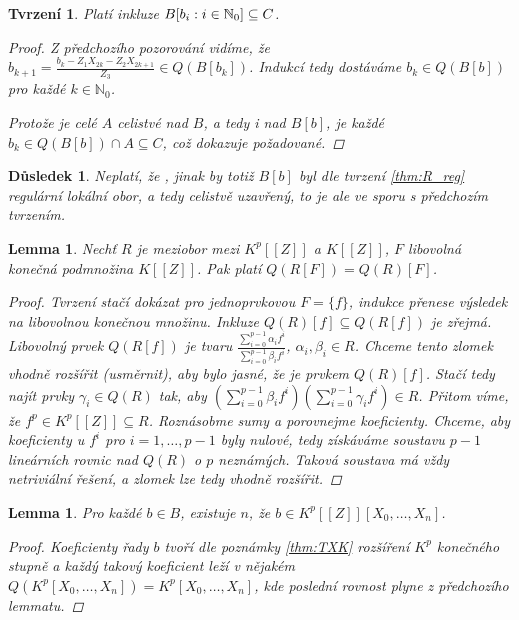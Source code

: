 \documentclass[11pt,a4paper]{article}
\newcommand\m[1]{\mathbb { #1 }} %
\newcommand\N{\m N}
\newcounter{numb}
\theoremstyle{definition}
\theoremstyle{plain}
\newtheorem{lemma}[numb]{Lemma}
\newtheorem{tvrzeni}[numb]{Tvrzení}
\newtheorem{dusledek}[numb]{Důsledek}
\begin{document}
\begin{tvrzeni}
	Platí inkluze $\Ball \subseteq C$.

	\begin{proof}
		Z předchozího pozorování vidíme, že $b_{k + 1} = \frac{b_k - Z_1 X_{2k} - Z_2 X_{2k + 1}}{Z_3} \in Q(B[b_k])$. Indukcí tedy dostáváme $b_k \in Q(B[b])$ pro každé $k \in \N_0$.

		Protože je celé $A$ celistvé nad $B$, a tedy i nad $B[b]$, je každé $b_k \in Q(B[b]) \cap A \subseteq C$, což dokazuje požadované.
	\end{proof}
\end{tvrzeni}

\begin{dusledek}
	Neplatí, že , jinak by totiž $B[b]$ byl dle tvrzení \ref{thm:R_reg} regulární lokální obor, a tedy celistvě uzavřený, to je ale ve sporu s předchozím tvrzením.
\end{dusledek}

\begin{lemma} \label{thm:QRf}
	Nechť $R$ je meziobor mezi $K^p[[Z]]$ a $K[[Z]]$, $F$ libovolná konečná podmnožina $K[[Z]]$. Pak platí $Q(R[F]) = Q(R)[F]$.
	
	\begin{proof}
		\newcommand*{\I}{_{i = 0}^{p - 1}}
		
		Tvrzení stačí dokázat pro jednoprvkovou $F = \{f\}$, indukce přenese výsledek na libovolnou konečnou množinu. Inkluze $Q(R)[f] \subseteq Q(R[f])$ je zřejmá. Libovolný prvek $Q(R[f])$ je tvaru $\frac{\sum\I \alpha_i f^i}{\sum\I \beta_i f^i}$, $\alpha_i, \beta_i \in R$. Chceme tento zlomek vhodně rozšířit (usměrnit), aby bylo jasné, že je prvkem $Q(R)[f]$. Stačí tedy najít prvky $\gamma_i \in Q(R)$ tak, aby $(\sum\I \beta_i f^i)(\sum\I \gamma_i f^i) \in R$. Přitom víme, že $f^p \in K^p[[Z]] \subseteq R$. Roznásobme sumy a porovnejme koeficienty. Chceme, aby koeficienty u $f^i$ pro $i = 1, \hdots, p - 1$ byly nulové, tedy získáváme soustavu $p - 1$ lineárních rovnic nad $Q(R)$ o $p$ neznámých. Taková soustava má vždy netriviální řešení, a zlomek lze tedy vhodně rozšířit.
	\end{proof}
\end{lemma}

\begin{lemma} \label{thm:B_vlastnost}
Pro každé $b \in B$, existuje $n$, že $b \in K^p[[Z]][X_0, \hdots, X_n]$.
	\begin{proof}
		 Koeficienty řady $b$ tvoří dle poznámky \ref{thm:TXK} rozšíření $K^p$ konečného stupně a každý takový koeficient leží v nějakém $Q(K^p[X_0, \hdots, X_n]) = K^p[X_0, \hdots, X_n]$, kde poslední rovnost plyne z předchozího lemmatu.
	\end{proof}
\end{lemma}
\end{document}
